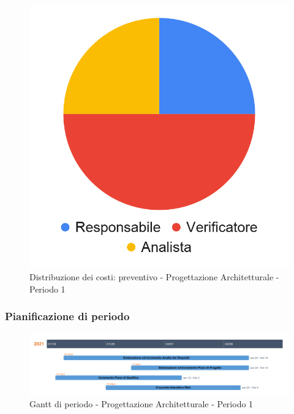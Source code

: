 \hspace{-1cm}
\begin{minipage}{.50\textwidth}
\smallPreventivoTable{
	
}
\end{minipage}
\hspace{1cm}
\begin{minipage}{.40\textwidth}
\begin{figure}[H]
	\includegraphics[scale=0.21]{res/images/charts/preventivo_priori/Grafico4-3.png}
	\caption{Distribuzione dei costi: preventivo - Progettazione Architetturale - Periodo 1}
\end{figure}
\end{minipage} 






\subsubsection{Pianificazione di periodo}

\begin{figure}[H]
	\centering
	\includegraphics[scale=0.35]{res/images/gantt_periodo/progarch_1_gantt.png}
	\caption{Gantt di periodo - Progettazione Architetturale - Periodo 1}
\end{figure}

